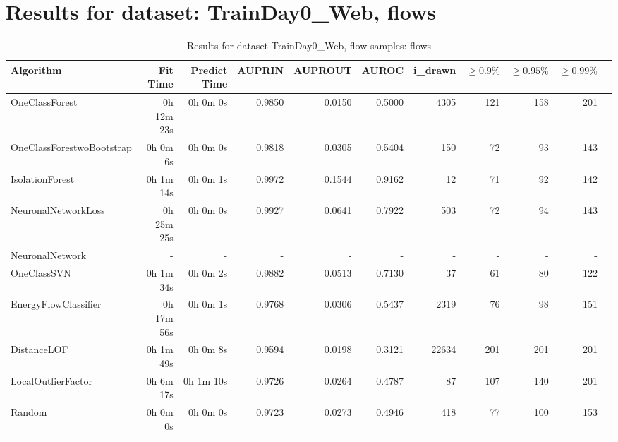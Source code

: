 \documentclass{article}
\begin{document}
\section*{Results for dataset: TrainDay0_Web, flows}
\begin{table}[h!]
\centering
\caption{Results for dataset TrainDay0_Web, flow samples: flows}
\begin{tabular}{lrrrrrrrrrr}
\toprule
Algorithm & Fit Time & Predict Time & AUPRIN & AUPROUT & AUROC & i\_drawn & $\geq 0.9\%$ & $\geq 0.95\%$ & $\geq 0.99\%$ \\
\midrule
OneClassForest & 0h 12m 23s & 0h 0m 0s & 0.9850 & 0.0150 & 0.5000 & 4305 & 121 & 158 & 201 \\
OneClassForestwoBootstrap & 0h 0m 6s & 0h 0m 0s & 0.9818 & 0.0305 & 0.5404 & 150 & 72 & 93 & 143 \\
IsolationForest & 0h 1m 14s & 0h 0m 1s & 0.9972 & 0.1544 & 0.9162 & 12 & 71 & 92 & 142 \\
NeuronalNetworkLoss & 0h 25m 25s & 0h 0m 0s & 0.9927 & 0.0641 & 0.7922 & 503 & 72 & 94 & 143 \\
NeuronalNetwork & - & - & - & - & - & - & - & - & - \\
OneClassSVN & 0h 1m 34s & 0h 0m 2s & 0.9882 & 0.0513 & 0.7130 & 37 & 61 & 80 & 122 \\
EnergyFlowClassifier & 0h 17m 56s & 0h 0m 1s & 0.9768 & 0.0306 & 0.5437 & 2319 & 76 & 98 & 151 \\
DistanceLOF & 0h 1m 49s & 0h 0m 8s & 0.9594 & 0.0198 & 0.3121 & 22634 & 201 & 201 & 201 \\
LocalOutlierFactor & 0h 6m 17s & 0h 1m 10s & 0.9726 & 0.0264 & 0.4787 & 87 & 107 & 140 & 201 \\
Random & 0h 0m 0s & 0h 0m 0s & 0.9723 & 0.0273 & 0.4946 & 418 & 77 & 100 & 153 \\
\bottomrule
\end{tabular}
\end{table}
\end{document}
